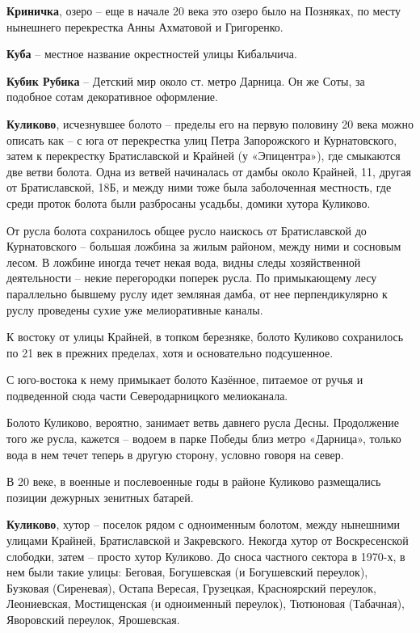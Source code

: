 \medskip


\textbf{Криничка}, озеро – еще в начале 20 века это озеро было на Позняках, по месту нынешнего перекрестка Анны Ахматовой и Григоренко.\\ 


\medskip

\textbf{Куба} – местное название окрестностей улицы Кибальчича.\\

\medskip

\textbf{Кубик Рубика} – Детский мир около ст. метро Дарница. Он же Соты, за подобное сотам декоративное оформление.\\

\medskip


\textbf{Куликово}, исчезнувшее болото – пределы его на первую половину 20 века можно описать как – с юга от перекрестка улиц Петра Запорожского и Курнатовского, затем к перекрестку Братиславской и Крайней (у «Эпицентра»), где смыкаются две ветви болота. Одна из ветвей начиналась от дамбы около Крайней, 11, другая от Братиславской, 18Б, и между ними тоже была заболоченная местность, где среди проток болота были разбросаны усадьбы, домики хутора Куликово.

От русла болота сохранилось общее русло наискось от Братиславской до Курнатовского – большая ложбина за жилым районом, между ними и сосновым лесом. В ложбине иногда течет некая вода, видны следы хозяйственной деятельности – некие перегородки поперек русла. По примыкающему лесу параллельно бывшему руслу идет земляная дамба, от нее перпендикулярно к руслу проведены сухие уже мелиоративные каналы.

К востоку от улицы Крайней, в топком березняке, болото Куликово сохранилось по 21 век в прежних пределах, хотя и основательно подсушенное.

С юго-востока к нему примыкает болото Казённое, питаемое от ручья и подведенной сюда части Северодарницкого мелиоканала.

Болото Куликово, вероятно, занимает ветвь давнего русла Десны. Продолжение того же русла, кажется – водоем в парке Победы близ метро «Дарница», только вода в нем течет теперь в другую сторону, условно говоря на север.

В 20 веке, в военные и послевоенные годы в районе Куликово размещались позиции дежурных зенитных батарей.\\

\medskip


\textbf{Куликово}, хутор – поселок рядом с одноименным болотом, между нынешними улицами Крайней, Братиславской и Закревского. Некогда хутор от Воскресенской слободки, затем – просто хутор Куликово. До сноса частного сектора в 1970-х, в нем были такие улицы: Беговая, Богушевская (и Богушевский переулок), Бузковая (Сиреневая), Остапа Вересая, Грузецкая, Красноярский переулок, Леониевская, Мостищенская (и одноименный переулок), Тютюновая (Табачная), Яворовский переулок, Ярошевская.

